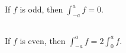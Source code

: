 \documentclass[11pt,letterpaper]{article}
\begin{document}
\subsection{}
If $f$ is odd, then $\int^a_{-a} f = 0$.

\subsection{}
If $f$ is even, then $\int^a_{-a} f = 2\int^a_{0} f$.



\vfill
\printbibliography
\end{document}
